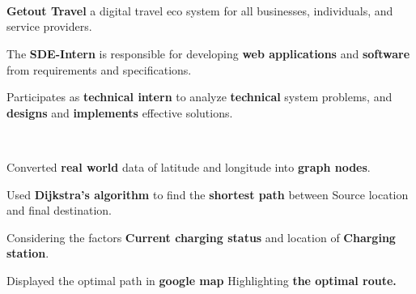 \documentclass[a4paper]{MagicalCV}
\begin{document}
\begin{minipage}[t]{0.66\textwidth} 

\\
\newline
{}\\
\\ 
\vspace{\topsep} %
\begin{tightemize}
\begin{small}
\item {\textbf{Getout Travel}} a digital travel eco system for all businesses, individuals, and service providers.
\item The \textbf{SDE-Intern} is responsible for developing \textbf{web applications} and
\textbf{software} from requirements and specifications.
\item Participates as \textbf{technical intern} to analyze
\textbf{technical} system problems, and \textbf{designs} and \textbf{implements} effective solutions.
\end{small}
\end{tightemize}
\sectionsep
\newline
\newline
\\


\vspace{\topsep} %
\begin{tightemize}
\begin{small}
\item Converted {\bf real world} data of latitude and longitude into
{\bf graph nodes}. 
\item Used {\bf Dijkstra’s algorithm} to find the {\bf shortest path} between Source location and final destination.
\item Considering the factors {\bf Current charging status} and
location of {\bf  Charging station}.
\item Displayed the optimal path in {\bf  google map }Highlighting
{\bf  the optimal route.}
\end{small}
\end{tightemize}
\sectionsep


\end{minipage}
\end{document}
